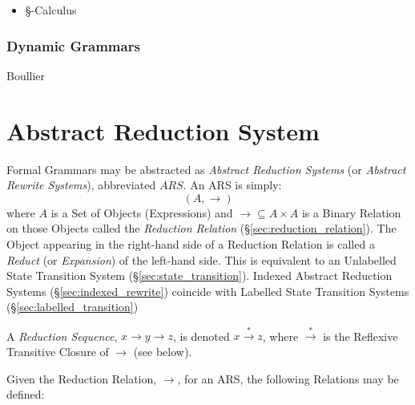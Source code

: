 \begin{itemize}
  \item \S-Calculus
\end{itemize}



\subsubsection{Dynamic Grammars}\label{sec:dynamic_grammar}

Boullier\cite{boullier94}



\section{Abstract Reduction System}\label{sec:abstract_rewrite}

Formal Grammars may be abstracted as \emph{Abstract Reduction Systems}
(or \emph{Abstract Rewrite Systems}), abbreviated $ARS$. An ARS is
simply:
\[
  (A,\rightarrow)
\]
where $A$ is a Set of Objects (Expressions) and $\rightarrow \subseteq
A \times A$ is a Binary Relation on those Objects called the
\emph{Reduction Relation} (\S\ref{sec:reduction_relation}). The Object
appearing in the right-hand side of a Reduction Relation is called a
\emph{Reduct} (or \emph{Expansion}) of the left-hand side. This is
equivalent to an Unlabelled State Transition System
(\S\ref{sec:state_transition}). Indexed Abstract Reduction Systems
(\S\ref{sec:indexed_rewrite}) coincide with Labelled State
Transition Systems (\S\ref{sec:labelled_transition})

A \emph{Reduction Sequence}, $x \rightarrow y \rightarrow z$, is
denoted $x \stackrel{*}\rightarrow z$, where $\stackrel{*}\rightarrow$
is the Reflexive Transitive Closure of $\rightarrow$ (see below).

Given the Reduction Relation, $\rightarrow$, for an ARS, the following
Relations may be defined:

